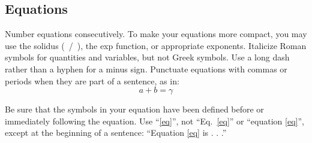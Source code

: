 \documentclass[conference]{IEEEtran}
\begin{document}
\subsection{Equations}
Number equations consecutively. To make your 
equations more compact, you may use the solidus (~/~), the exp function, or 
appropriate exponents. Italicize Roman symbols for quantities and variables, 
but not Greek symbols. Use a long dash rather than a hyphen for a minus 
sign. Punctuate equations with commas or periods when they are part of a 
sentence, as in:
\begin{equation}
a+b=\gamma\label{eq}
\end{equation}

Be sure that the 
symbols in your equation have been defined before or immediately following 
the equation. Use ``\eqref{eq}'', not ``Eq.~\eqref{eq}'' or ``equation \eqref{eq}'', except at 
the beginning of a sentence: ``Equation \eqref{eq} is . . .''
\end{document}
